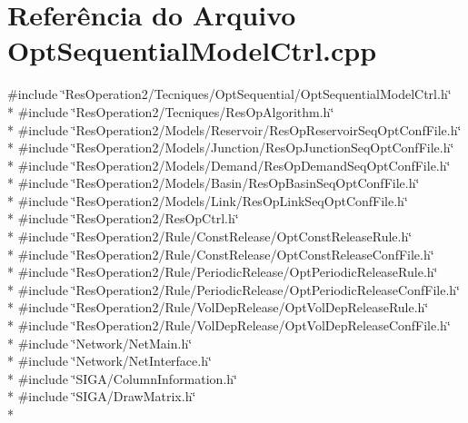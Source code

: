 \section{Referência do Arquivo Opt\+Sequential\+Model\+Ctrl.\+cpp}
\label{_opt_sequential_model_ctrl_8cpp}
{\ttfamily \#include \char`\"{}Res\+Operation2/\+Tecniques/\+Opt\+Sequential/\+Opt\+Sequential\+Model\+Ctrl.\+h\char`\"{}}\\*
{\ttfamily \#include \char`\"{}Res\+Operation2/\+Tecniques/\+Res\+Op\+Algorithm.\+h\char`\"{}}\\*
{\ttfamily \#include \char`\"{}Res\+Operation2/\+Models/\+Reservoir/\+Res\+Op\+Reservoir\+Seq\+Opt\+Conf\+File.\+h\char`\"{}}\\*
{\ttfamily \#include \char`\"{}Res\+Operation2/\+Models/\+Junction/\+Res\+Op\+Junction\+Seq\+Opt\+Conf\+File.\+h\char`\"{}}\\*
{\ttfamily \#include \char`\"{}Res\+Operation2/\+Models/\+Demand/\+Res\+Op\+Demand\+Seq\+Opt\+Conf\+File.\+h\char`\"{}}\\*
{\ttfamily \#include \char`\"{}Res\+Operation2/\+Models/\+Basin/\+Res\+Op\+Basin\+Seq\+Opt\+Conf\+File.\+h\char`\"{}}\\*
{\ttfamily \#include \char`\"{}Res\+Operation2/\+Models/\+Link/\+Res\+Op\+Link\+Seq\+Opt\+Conf\+File.\+h\char`\"{}}\\*
{\ttfamily \#include \char`\"{}Res\+Operation2/\+Res\+Op\+Ctrl.\+h\char`\"{}}\\*
{\ttfamily \#include \char`\"{}Res\+Operation2/\+Rule/\+Const\+Release/\+Opt\+Const\+Release\+Rule.\+h\char`\"{}}\\*
{\ttfamily \#include \char`\"{}Res\+Operation2/\+Rule/\+Const\+Release/\+Opt\+Const\+Release\+Conf\+File.\+h\char`\"{}}\\*
{\ttfamily \#include \char`\"{}Res\+Operation2/\+Rule/\+Periodic\+Release/\+Opt\+Periodic\+Release\+Rule.\+h\char`\"{}}\\*
{\ttfamily \#include \char`\"{}Res\+Operation2/\+Rule/\+Periodic\+Release/\+Opt\+Periodic\+Release\+Conf\+File.\+h\char`\"{}}\\*
{\ttfamily \#include \char`\"{}Res\+Operation2/\+Rule/\+Vol\+Dep\+Release/\+Opt\+Vol\+Dep\+Release\+Rule.\+h\char`\"{}}\\*
{\ttfamily \#include \char`\"{}Res\+Operation2/\+Rule/\+Vol\+Dep\+Release/\+Opt\+Vol\+Dep\+Release\+Conf\+File.\+h\char`\"{}}\\*
{\ttfamily \#include \char`\"{}Network/\+Net\+Main.\+h\char`\"{}}\\*
{\ttfamily \#include \char`\"{}Network/\+Net\+Interface.\+h\char`\"{}}\\*
{\ttfamily \#include \char`\"{}S\+I\+G\+A/\+Column\+Information.\+h\char`\"{}}\\*
{\ttfamily \#include \char`\"{}S\+I\+G\+A/\+Draw\+Matrix.\+h\char`\"{}}\\*
